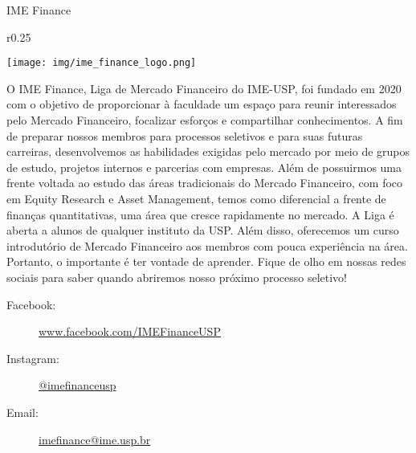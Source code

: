 \begin{subsecao}{IME Finance}

\begin{wrapfigure}{r}{0.25\textwidth}
	\vspace{-25pt}
	\begin{center}
		\texttt{[image: img/ime\_finance\_logo.png]}
	\end{center}
	\vspace{-25pt}
\end{wrapfigure}

O IME Finance, Liga de Mercado Financeiro do IME-USP, foi fundado em 2020 com o 
objetivo de proporcionar à faculdade um espaço para reunir interessados pelo 
Mercado Financeiro, focalizar esforços e compartilhar conhecimentos.
A fim de preparar nossos membros para processos seletivos e para suas futuras 
carreiras, desenvolvemos as habilidades exigidas pelo mercado por meio de grupos de 
estudo, projetos internos e parcerias com empresas. Além de possuirmos uma frente 
voltada ao estudo das áreas tradicionais do Mercado Financeiro, com foco em Equity
Research e Asset Management, temos como diferencial a frente de finanças quantitativas, 
uma área que cresce rapidamente no mercado. A Liga é aberta a alunos de qualquer 
instituto da USP. Além disso, oferecemos um curso introdutório de Mercado Financeiro 
aos membros com pouca experiência na área. Portanto, o importante é ter vontade de 
aprender. Fique de olho em nossas redes sociais para saber quando abriremos nosso 
próximo processo seletivo!

\begin{description}
  \item[Facebook:] \url{www.facebook.com/IMEFinanceUSP}
  \item[Instagram:] \url{@imefinanceusp}
  \item[Email:] \url{imefinance@ime.usp.br}
\end{description}

\end{subsecao}
